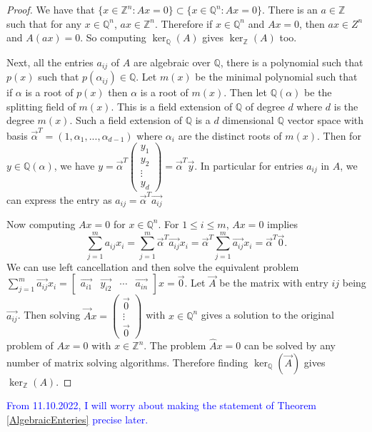 \documentclass{article}
\renewcommand{\leq}{\leqslant}
\newcommand{\Z}[0]{\mathbb{Z}}		%
\newcommand{\Q}[0]{\mathbb{Q}}		%
\theoremstyle{definition}
\theoremstyle{remark}
\begin{document}
\begin{proof} %
We have that $\{x\in \Z^n : Ax = 0\} \subset \{x\in \Q^n : Ax =0\}$. There is an $a\in \Z$ such that for any  $x\in \Q^n$, $ax \in \Z^n$. Therefore if $x\in \Q^n$ and $Ax =0$, then $ax\in Z^n$ and $A(ax) = 0$. So computing $\ker_\Q(A)$ gives $\ker_\Z(A)$ too. 

Next, all the entries $a_{ij}$ of $A$ are algebraic over $\Q$, there is a polynomial such that $p(x)$ such that $p(\alpha_{ij}) \in \Q$. Let $m(x)$ be the minimal polynomial such that if $\alpha$ is a root of $p(x)$ then $\alpha$ is a root of $m(x)$. Then let $\Q(\alpha)$ be the splitting field of $m(x)$. This is a field extension of $\Q$ of degree $d$ where $d$ is the degree $m(x)$. Such a field extension of $\Q$ is a $d$ dimensional $\Q$ vector space with basis  $\vec{\alpha}^T = (1,\alpha_1,...,\alpha_{d-1})$ where $\alpha_i$ are the distinct roots of $m(x)$. Then for $y\in \Q(\alpha)$, we have $y =\vec{\alpha}^T \begin{pmatrix}
y_1\\ y_2\\ \vdots \\ y_d 
\end{pmatrix} = \vec{\alpha}^T \vec{y}$. In particular for entries $a_{ij} $ in $A$, we can express the entry as  $a_{ij}=\vec{\alpha}^T \vec{a_{ij}} $

Now computing $Ax =0$ for $x\in \Q^n$. For $1\leq i\leq m$, $Ax=0$ implies \begin{equation}
    \sum_{j=1}^m a_{ij} x_i = \sum_{j=1}^m \vec{\alpha}^T \vec{a_{ij}} x_i  = \vec{\alpha}^T\sum_{j=1}^m  \vec{a_{ij}} x_i  =\vec{\alpha}^T \vec{0}.
\end{equation} We can use left cancellation and then solve the equivalent problem $ \sum_{j=1}^m \vec{a_{ij}} x_i = \begin{bmatrix} \vec{a_{i1}} & \vec{y_{i2}} & \cdots & \vec{a_{in}} \end{bmatrix} x=  \vec{0}$.  Let $\vec{A}$ be the matrix with entry $ij$ being $\vec{a_{ij}}$. Then solving   $\vec{A} x  =  \begin{pmatrix}\vec{0} \\ \vdots \\ \vec{0}
\end{pmatrix}$ with $x\in \Q^n$ gives a solution to the original problem of $Ax = 0$ with $x\in\Z^n$. The problem  $\hat A x = 0$ can be solved by any number of matrix solving algorithms. Therefore finding $\ker_\Q(\vec{A})$ gives $\ker_\Z(A).$



\end{proof}
\textcolor{blue}{From 11.10.2022, I will worry about making the statement of Theorem \ref{AlgebraicEnteries} precise later.}
\end{document}
